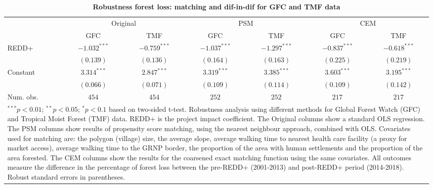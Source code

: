 \documentclass[
]{article}
\begin{document}
\begin{table}[h]
\caption{\textbf{Robustness forest loss: matching and dif-in-dif for GFC and TMF data}}
\begin{center}
\begin{tabular}{l c c c c c c}
\hline
 & \multicolumn{2}{c}{Original} & \multicolumn{2}{c}{PSM} & \multicolumn{2}{c}{CEM} \\
\cline{2-3} \cline{4-5} \cline{6-7}
 & GFC & TMF & GFC & TMF & GFC & TMF \\
\hline
REDD+     & $-1.032^{***}$ & $-0.759^{***}$ & $-1.037^{***}$ & $-1.297^{***}$ & $-0.837^{***}$ & $-0.618^{***}$ \\
          & $(0.139)$      & $(0.136)$      & $(0.164)$      & $(0.163)$      & $(0.225)$      & $(0.219)$      \\
Constant  & $3.314^{***}$  & $2.847^{***}$  & $3.319^{***}$  & $3.385^{***}$  & $3.603^{***}$  & $3.195^{***}$  \\
          & $(0.066)$      & $(0.071)$      & $(0.109)$      & $(0.114)$      & $(0.109)$      & $(0.142)$      \\
\hline
Num. obs. & $454$          & $454$          & $252$          & $252$          & $217$          & $217$          \\
\hline
\multicolumn{7}{l}{\scriptsize{\parbox{.80\linewidth}{\vspace{2pt}$^{***}p<0.01$; $^{**}p<0.05$; $^{*}p<0.1$ based on two-sided t-test.\\
                      Robustness analysis using different methods for Global Forest Watch (GFC) and Tropical Moist Forest (TMF) data. REDD+ is the project impact coefficient. The Original columns show a standard OLS regression. The PSM columns show results of propensity score matching, using the nearest neighbour approach, combined with OLS. Covariates used for matching are: the polygon (village) size, the average slope, average walking time to nearest health care facility (a proxy for market access), average walking time to the GRNP border, the proportion of the area with human settlements and the proportion of the area forested. The CEM columns show the results for the coarsened exact matching function using the same covariates. All outcomes measure the difference in the percentage of forest loss between the pre-REDD+ (2001-2013) and post-REDD+ period (2014-2018). Robust standard errors in parentheses.}}}
\end{tabular}
\label{table:coefficients}
\end{center}
\end{table}
\end{document}
